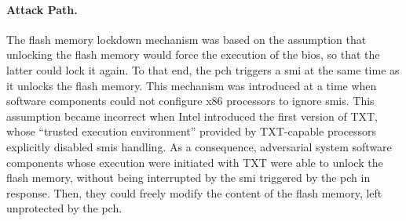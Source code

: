 \paragraph{Attack Path.}
%
The flash memory lockdown mechanism was based on the assumption that unlocking
the flash memory would force the execution of the \ac{bios}, so that the latter
could lock it again.
%
To that end, the \ac{pch} triggers a \ac{smi} at the same time as it unlocks the
flash memory.
%
This mechanism was introduced at a time when software components could not
configure x86 processors to ignore \acp{smi}.
%
This assumption became incorrect when Intel introduced the first version of TXT,
whose ``trusted execution environment'' provided by TXT-capable processors
explicitly disabled \acp{smi} handling.
%
As a consequence, adversarial system software components whose execution were
initiated with TXT were able to unlock the flash memory, without being
interrupted by the \ac{smi} triggered by the \ac{pch} in response.
%
Then, they could freely modify the content of the flash memory, left unprotected
by the \ac{pch}.

